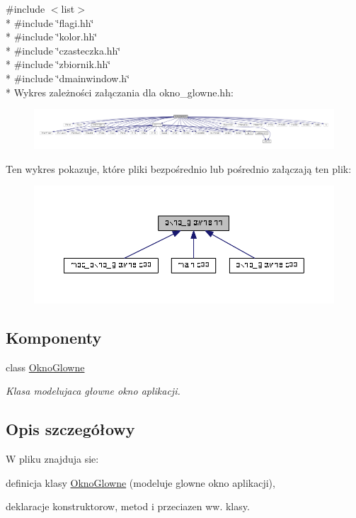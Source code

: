 {\ttfamily \#include $<$list$>$}\\*
{\ttfamily \#include \char`\"{}flagi.\+hh\char`\"{}}\\*
{\ttfamily \#include \char`\"{}kolor.\+hh\char`\"{}}\\*
{\ttfamily \#include \char`\"{}czasteczka.\+hh\char`\"{}}\\*
{\ttfamily \#include \char`\"{}zbiornik.\+hh\char`\"{}}\\*
{\ttfamily \#include \char`\"{}dmainwindow.\+h\char`\"{}}\\*
Wykres zależności załączania dla okno\+\_\+glowne.\+hh\+:
\nopagebreak
\begin{figure}[H]
\begin{center}
\leavevmode
\includegraphics[width=350pt]{okno__glowne_8hh__incl}
\end{center}
\end{figure}
Ten wykres pokazuje, które pliki bezpośrednio lub pośrednio załączają ten plik\+:
\nopagebreak
\begin{figure}[H]
\begin{center}
\leavevmode
\includegraphics[width=350pt]{okno__glowne_8hh__dep__incl}
\end{center}
\end{figure}
\subsection*{Komponenty}
\begin{DoxyCompactItemize}
\item 
class \hyperlink{class_okno_glowne}{Okno\+Glowne}
\begin{DoxyCompactList}\small\item\em Klasa modelujaca głowne okno aplikacji. \end{DoxyCompactList}\end{DoxyCompactItemize}


\subsection{Opis szczegółowy}
W pliku znajduja sie\+:
\begin{DoxyItemize}
\item definicja klasy \hyperlink{class_okno_glowne}{Okno\+Glowne} (modeluje glowne okno aplikacji),
\item deklaracje konstruktorow, metod i przeciazen ww. klasy. 
\end{DoxyItemize}